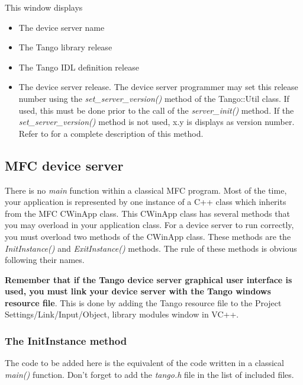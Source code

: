 This window displays 
\begin{itemize}
\item The device server name
\item The Tango library release
\item The Tango IDL definition release
\item The device server release. The device server programmer may set this
release number using the \emph{set\_server\_version()}
method of the Tango::Util class. If used, this must be
done prior to the call of the \emph{server\_init()} method. If the
\emph{set\_server\_version()} method is not used, x.y is displays
as version number. Refer to \cite{TANGO_ref_man} for a complete description
of this method.
\end{itemize}

\subsection{MFC device server}

There is no \emph{main} function within a classical MFC
program. Most of the time, your application is represented by one
instance of a C++ class which inherits from the MFC CWinApp class.
This CWinApp class has several methods that you may overload in your
application class. For a device server to run correctly, you must
overload two methods of the CWinApp class. These methods are the \emph{InitInstance()}
and \emph{ExitInstance()} methods. The rule of
these methods is obvious following their names.

\textbf{Remember that if the Tango device server graphical user interface
is used, you must link your device server with the Tango windows resource
file}. This is done by adding the Tango resource file to the Project
Settings/Link/Input/Object, library modules window in VC++.


\subsubsection{The InitInstance method}

The code to be added here is the equivalent of the code written in
a classical \emph{main()} function. Don't forget to add the \emph{tango.h}
file in the list of included files.


